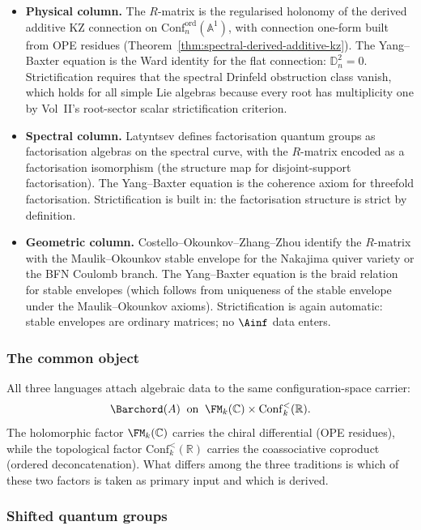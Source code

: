 \begin{itemize}
\item \textbf{Physical column.}
The $R$-matrix is the regularised holonomy of the derived additive KZ
connection on $\mathrm{Conf}_n^{\mathrm{ord}}(\mathbb{A}^1)$, with
connection one-form built from OPE residues
(Theorem~\ref{thm:spectral-derived-additive-kz}).
The Yang--Baxter equation is the Ward identity for the flat connection:
$\mathbb{D}_n^2=0$. Strictification requires that the spectral Drinfeld
obstruction class vanish, which holds for all simple Lie algebras because
every root has multiplicity one by Vol~II's root-sector scalar
strictification criterion.

\item \textbf{Spectral column.}
Latyntsev defines factorisation quantum groups as factorisation algebras on
the spectral curve, with the $R$-matrix encoded as a factorisation
isomorphism (the structure map for disjoint-support factorisation). The
Yang--Baxter equation is the coherence axiom for threefold factorisation.
Strictification is built in: the factorisation structure is strict by
definition.

\item \textbf{Geometric column.}
Costello--Okounkov--Zhang--Zhou identify the $R$-matrix with the
Maulik--Okounkov stable envelope for the Nakajima quiver variety or the BFN
Coulomb branch. The Yang--Baxter equation is the braid relation for stable
envelopes (which follows from uniqueness of the stable envelope under the
Maulik--Okounkov axioms). Strictification is again automatic: stable
envelopes are ordinary matrices; no $\Ainf$ data enters.
\end{itemize}

\subsubsection*{The common object}

All three languages attach algebraic data to the same
configuration-space carrier:
\[
\Barchord(A)\;\;\text{on}\;\;
\FM_k(\mathbb{C})\times\mathrm{Conf}_k^<(\mathbb{R}).
\]
The holomorphic factor $\FM_k(\mathbb{C})$ carries the chiral
differential (OPE residues), while the topological factor
$\mathrm{Conf}_k^<(\mathbb{R})$ carries the coassociative coproduct
(ordered deconcatenation). What differs among the three traditions
is which of these two factors is taken as primary input and which
is derived.

\subsubsection*{Shifted quantum groups}

